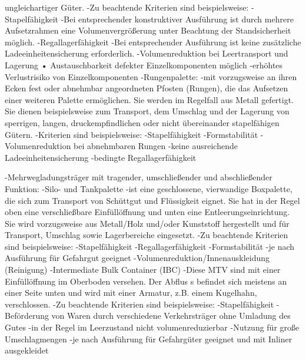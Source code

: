            ungleichartiger Güter.
            -Zu beachtende Kriterien sind beispielsweise:
                -Stapelfähigkeit 
                -Bei entsprechender konstruktiver Ausführung ist durch mehrere Aufsetzrahmen eine Volumenvergrößerung unter Beachtung der Standsicherheit möglich. 
                -Regallagerfähigkeit 
                -Bei entsprechender Ausführung ist keine zusätzliche Ladeeinheitensicherung erforderlich. 
                -Volumenreduktion bei Leertransport und Lagerung • Austauschbarkeit defekter Einzelkomponenten möglich 
                -erhöhtes Verlustrisiko von Einzelkomponenten 
        -Rungenpalette:
            -mit vorzugsweise an ihren Ecken fest oder abnehmbar angeordneten Pfosten (Rungen), die das Aufsetzen einer weiteren Palette ermöglichen. Sie werden im Regelfall aus Metall gefertigt. Sie dienen beispielsweise zum Transport, dem Umschlag und der Lagerung von sperrigen, langen, druckempfindlichen oder nicht übereinander stapelfähigen Gütern. 
            -Kriterien sind beispielsweise: 
                -Stapelfähigkeit 
                -Formstabilität
                -Volumenreduktion bei abnehmbaren Rungen 
                -keine ausreichende Ladeeinheitensicherung 
                -bedingte Regallagerfähigkeit

    -Mehrwegladungsträger mit tragender, umschließender und abschließender Funktion:
        -Silo- und Tankpalette
            -ist eine geschlossene, vierwandige Boxpalette, die sich zum Transport von Schüttgut und Flüssigkeit eignet. Sie hat in der Regel oben eine verschließbare Einfüllöffnung und unten eine Entleerungseinrichtung. Sie wird vorzugsweise aus Metall/Holz und/oder Kunststoff hergestellt und für Transport, Umschlag sowie Lagerbereiche eingesetzt. 
            -Zu beachtende Kriterien sind beispielsweise: 
                -Stapelfähigkeit 
                -Regallagerfähigkeit 
                -Formstabilität 
                -je nach Ausführung für Gefahrgut geeignet 
                -Volumenreduktion/Innenauskleidung (Reinigung)
        -Intermediate Bulk Container (IBC)
            -Diese MTV sind mit einer Einfüllöffnung im Oberboden versehen. Der Abflus s befindet sich meistens an einer Seite unten und wird mit einer Armatur, z.B. einem Kugelhahn, verschlossen. 
            -Zu beachtende Kriterien sind beispielsweise: 
                -Stapelfähigkeit 
                -Beförderung von Waren durch verschiedene Verkehrsträger ohne Umladung des Gutes 
                -in der Regel im Leerzustand nicht volumenreduzierbar
                -Nutzung für große Umschlagmengen 
                -je nach Ausführung für Gefahrgüter geeignet und mit Inliner ausgekleidet
                
